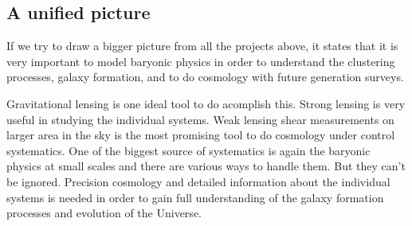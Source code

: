 \subsection{A unified picture}

If we try to draw a bigger picture from all the projects above, it states that it is very important to model baryonic physics in order to understand the clustering processes,
galaxy formation, and to do cosmology with future generation surveys. 

Gravitational lensing is one ideal tool to do acomplish this. Strong lensing
is very useful in studying the individual systems. 
Weak lensing shear measurements
on larger area in the sky is the most promising tool to do cosmology under
control systematics. One of the biggest source of systematics is again the 
baryonic physics at small scales and there are various ways to handle them. But
they can't be ignored. Precision cosmology and detailed information about the 
individual systems is needed in order to gain full understanding of the 
galaxy formation processes and evolution of the Universe. 














